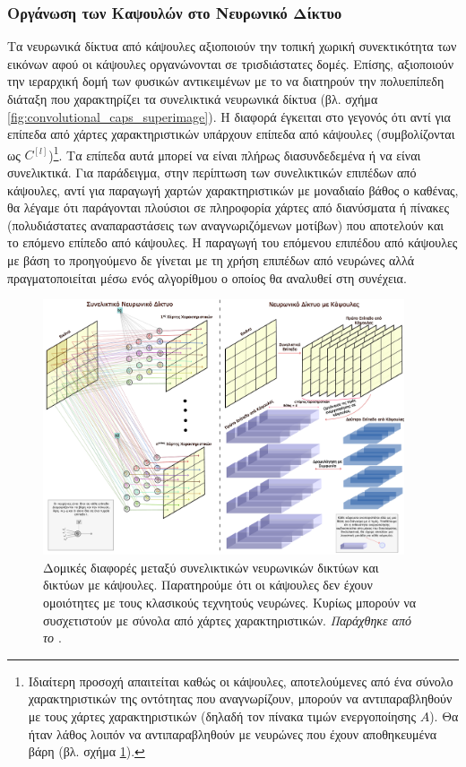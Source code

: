 \subsubsection{Οργάνωση των Καψουλών στο Νευρωνικό Δίκτυο}

Τα νευρωνικά δίκτυα από κάψουλες αξιοποιούν την τοπική χωρική συνεκτικότητα των εικόνων αφού οι κάψουλες οργανώνονται σε τρισδιάστατες δομές. Επίσης, αξιοποιούν την ιεραρχική δομή των φυσικών αντικειμένων με το να διατηρούν την πολυεπίπεδη διάταξη που χαρακτηρίζει τα συνελικτικά νευρωνικά δίκτυα (βλ. σχήμα \ref{fig:convolutional_caps_superimage}). Η διαφορά έγκειται στο γεγονός ότι αντί για επίπεδα από χάρτες χαρακτηριστικών υπάρχουν επίπεδα από κάψουλες (συμβολίζονται ως $C^{[l]}$)\footnote{Ιδιαίτερη προσοχή απαιτείται καθώς οι κάψουλες, αποτελούμενες από ένα σύνολο χαρακτηριστικών της οντότητας που αναγνωρίζουν, μπορούν να αντιπαραβληθούν με τους χάρτες χαρακτηριστικών (δηλαδή τον πίνακα τιμών ενεργοποίησης $A$). Θα ήταν λάθος λοιπόν να αντιπαραβληθούν με νευρώνες που έχουν αποθηκευμένα βάρη (βλ. σχήμα \ref{fig:conv_vs_caps_superimage}).}. Τα επίπεδα αυτά μπορεί να είναι πλήρως διασυνδεδεμένα ή να είναι συνελικτικά. Για παράδειγμα, στην περίπτωση των συνελικτικών επιπέδων από κάψουλες, αντί για παραγωγή χαρτών χαρακτηριστικών με μοναδιαίο βάθος ο καθένας, θα λέγαμε ότι παράγονται πλούσιοι σε πληροφορία χάρτες από διανύσματα ή πίνακες (πολυδιάστατες αναπαραστάσεις των αναγνωριζόμενων μοτίβων) που αποτελούν και το επόμενο επίπεδο από κάψουλες. Η παραγωγή του επόμενου επιπέδου από κάψουλες με βάση το προηγούμενο δε γίνεται με τη χρήση επιπέδων από νευρώνες αλλά πραγματοποιείται μέσω ενός αλγορίθμου  ο οποίος θα αναλυθεί στη συνέχεια.\par

\begin{figure}[h]
  \centering
  \includegraphics[width=0.95\textwidth]{images/chapter theoritical background/convolve_vs_capsule_gr.pdf}
  \caption{Δομικές διαφορές μεταξύ συνελικτικών νευρωνικών δικτύων και δικτύων με κάψουλες. Παρατηρούμε ότι οι κάψουλες δεν έχουν ομοιότητες με τους κλασικούς τεχνητούς νευρώνες. Κυρίως μπορούν να συσχετιστούν με σύνολα από χάρτες χαρακτηριστικών. \textit{Παράχθηκε από το \href{https://inkscape.org/}{}}.}
  \label{fig:conv_vs_caps_superimage}
\end{figure}

